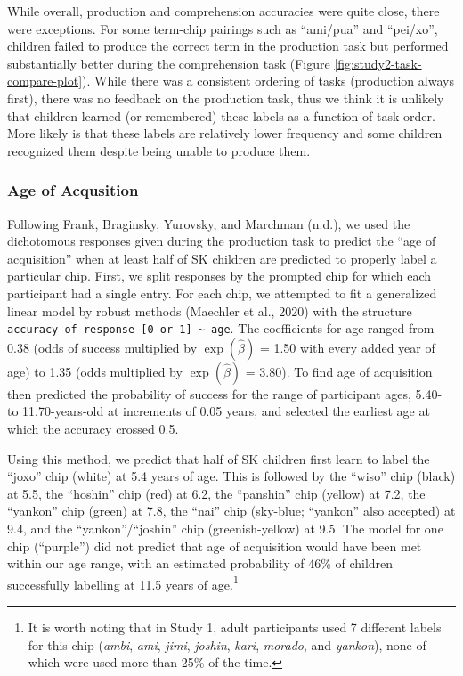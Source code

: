 \documentclass[
  english,
  ,man,floatsintext]{apa6}
\begin{document}
While overall, production and comprehension accuracies were quite close, there were exceptions. For some term-chip pairings such as \enquote{ami/pua} and \enquote{pei/xo}, children failed to produce the correct term in the production task but performed substantially better during the comprehension task (Figure \ref{fig:study2-task-compare-plot}). While there was a consistent ordering of tasks (production always first), there was no feedback on the production task, thus we think it is unlikely that children learned (or remembered) these labels as a function of task order. More likely is that these labels are relatively lower frequency and some children recognized them despite being unable to produce them.

\hypertarget{age-of-acqusition}{%
\subsubsection{Age of Acqusition}\label{age-of-acqusition}}

Following Frank, Braginsky, Yurovsky, and Marchman (n.d.), we used the dichotomous responses given during the production task to predict the \enquote{age of acquisition} when at least half of SK children are predicted to properly label a particular chip. First, we split responses by the prompted chip for which each participant had a single entry. For each chip, we attempted to fit a generalized linear model by robust methods (Maechler et al., 2020) with the structure \texttt{accuracy\ of\ response\ {[}0\ or\ 1{]}\ \textasciitilde{}\ age}. The coefficients for age ranged from 0.38 (odds of success multiplied by \(\exp{(\hat{\beta})}\) = 1.50 with every added year of age) to 1.35 (odds multiplied by \(\exp{(\hat{\beta})}\) = 3.80). To find age of acquisition then predicted the probability of success for the range of participant ages, 5.40- to 11.70-years-old at increments of 0.05 years, and selected the earliest age at which the accuracy crossed 0.5.

Using this method, we predict that half of SK children first learn to label the \enquote{joxo} chip (white) at 5.4 years of age. This is followed by the \enquote{wiso} chip (black) at 5.5, the \enquote{hoshin} chip (red) at 6.2, the \enquote{panshin} chip (yellow) at 7.2, the \enquote{yankon} chip (green) at 7.8, the \enquote{nai} chip (sky-blue; \enquote{yankon} also accepted) at 9.4, and the \enquote{yankon}/\enquote{joshin} chip (greenish-yellow) at 9.5. The model for one chip (\enquote{purple}) did not predict that age of acquisition would have been met within our age range, with an estimated probability of 46\% of children successfully labelling at 11.5 years of age.\footnote{It is worth noting that in Study 1, adult participants used 7 different labels for this chip (\emph{ambi}, \emph{ami}, \emph{jimi}, \emph{joshin}, \emph{kari}, \emph{morado}, and \emph{yankon}), none of which were used more than 25\% of the time.}
\end{document}
